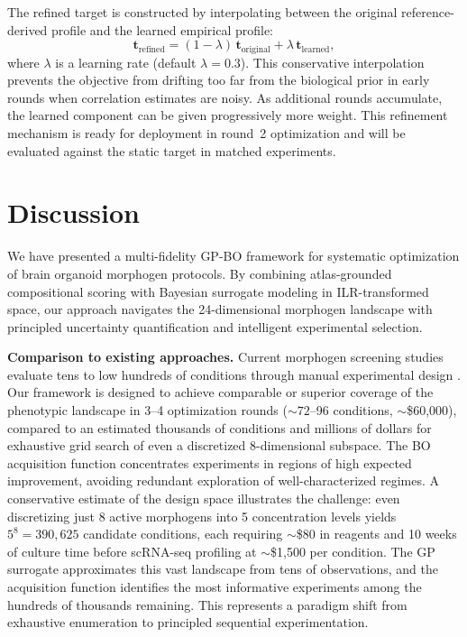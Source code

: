 \documentclass[times,twoside]{zHenriquesLab-StyleBioRxiv}
\begin{document}
The refined target is constructed by interpolating between the original reference-derived profile and the learned empirical profile:
\begin{equation}
  \bm{t}_\text{refined} = (1 - \lambda)\,\bm{t}_\text{original} + \lambda\,\bm{t}_\text{learned},
\end{equation}
where $\lambda$ is a learning rate (default $\lambda{=}0.3$). This conservative interpolation prevents the objective from drifting too far from the biological prior in early rounds when correlation estimates are noisy. As additional rounds accumulate, the learned component can be given progressively more weight. This refinement mechanism is ready for deployment in round~2 optimization and will be evaluated against the static target in matched experiments.

\section*{Discussion}

We have presented a multi-fidelity GP-BO framework for systematic optimization of brain organoid morphogen protocols. By combining atlas-grounded compositional scoring with Bayesian surrogate modeling in ILR-transformed space, our approach navigates the 24-dimensional morphogen landscape with principled uncertainty quantification and intelligent experimental selection.

\textbf{Comparison to existing approaches.} Current morphogen screening studies evaluate tens to low hundreds of conditions through manual experimental design \cite{Amin2024, SanchisCalleja2025}. Our framework is designed to achieve comparable or superior coverage of the phenotypic landscape in 3--4 optimization rounds (${\sim}72$--96 conditions, ${\sim}$\$60,000), compared to an estimated thousands of conditions and millions of dollars for exhaustive grid search of even a discretized 8-dimensional subspace. The BO acquisition function concentrates experiments in regions of high expected improvement, avoiding redundant exploration of well-characterized regimes. A conservative estimate of the design space illustrates the challenge: even discretizing just 8 active morphogens into 5 concentration levels yields $5^8 = 390{,}625$ candidate conditions, each requiring ${\sim}$\$80 in reagents and 10 weeks of culture time before scRNA-seq profiling at ${\sim}$\$1,500 per condition. The GP surrogate approximates this vast landscape from tens of observations, and the acquisition function identifies the most informative experiments among the hundreds of thousands remaining. This represents a paradigm shift from exhaustive enumeration to principled sequential experimentation.
\end{document}

